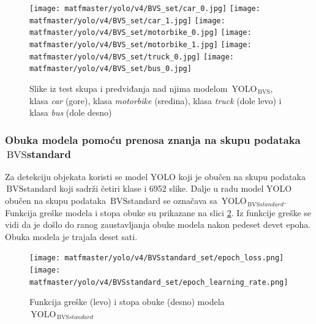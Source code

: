 \documentclass[12pt,oneside]{memoir}
\newcommand{\yolo}{\ensuremath{\,\textrm{YOLO}}}
\newcommand{\bvs}{\ensuremath{\,\textrm{BVS}}}
\begin{document}
\begin{figure}[!htbp]
\centering
  \texttt{[image: matfmaster/yolo/v4/BVS\_set/car\_0.jpg]}
  \texttt{[image: matfmaster/yolo/v4/BVS\_set/car\_1.jpg]}
  \texttt{[image: matfmaster/yolo/v4/BVS\_set/motorbike\_0.jpg]}
  \texttt{[image: matfmaster/yolo/v4/BVS\_set/motorbike\_1.jpg]}
  \texttt{[image: matfmaster/yolo/v4/BVS\_set/truck\_0.jpg]}
  \texttt{[image: matfmaster/yolo/v4/BVS\_set/bus\_0.jpg]}
\caption{Slike iz test skupa i predviđanja nad njima modelom $\yolo_{\bvs}$, klasa \textit{car} (gore), klasa \textit{motorbike} (sredina), klasa \textit{truck} (dole levo) i klasa \textit{bus} (dole desno)}
\label{fig:YOLO4_BVS_predictions}
\end{figure}



\subsubsection{Obuka modela pomoću prenosa znanja na skupu podataka \bvs{standard}}

%
%
%
%
%
%
Za detekciju objekata koristi se model YOLO koji je obučen na skupu podataka \bvs{standard} koji sadrži četiri klase i 6952 slike. Dalje u radu model YOLO obučen na skupu podataka \bvs{standard} se označava sa $\yolo_{\bvs{standard}}$. Funkcija greške modela i stopa obuke su prikazane na slici \ref{fig:YOLO4_BVSstandard_loss}. Iz funkcije greške se vidi da je došlo do ranog zaustavljanja obuke modela nakon pedeset devet epoha. Obuka modela je trajala deset sati.



\begin{figure}[!ht]
\centering
    \texttt{[image: matfmaster/yolo/v4/BVSstandard\_set/epoch\_loss.png]}
    \texttt{[image: matfmaster/yolo/v4/BVSstandard\_set/epoch\_learning\_rate.png]}
\caption{Funkcija greške (levo) i stopa obuke (desno) modela $\yolo_{\bvs{standard}}$ }
\label{fig:YOLO4_BVSstandard_loss}
\end{figure}
\end{document}

